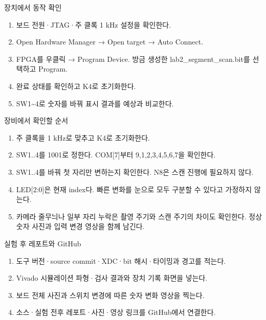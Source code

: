 \begin{frame}{장치에서 동작 확인}
\small
\begin{enumerate}
\item 보드 전원·JTAG·주 클록 1 kHz 설정을 확인한다.
\item Open Hardware Manager → Open target → Auto Connect.
\item FPGA를 우클릭 → Program Device. 방금 생성한 lab2\_segment\_scan.bit를 선택하고 Program.
\item 완료 상태를 확인하고 K4로 초기화한다.
\item SW1\textasciitilde{}4로 숫자를 바꿔 표시 결과를 예상과 비교한다.
\end{enumerate}
\end{frame}

\begin{frame}{장비에서 확인할 순서}
\small
\begin{enumerate}
\item 주 클록을 1 kHz로 맞추고 K4로 초기화한다.
\item SW1..4를 1001로 정한다. COM[7]부터 9,1,2,3,4,5,6,7을 확인한다.
\item SW1..4를 바꿔 첫 자리만 변하는지 확인한다. N8은 스캔 진행에 필요하지 않다.
\item LED[2:0]은 현재 index다. 빠른 변화를 눈으로 모두 구분할 수 있다고 가정하지 않는다.
\item 카메라 줄무늬나 일부 자리 누락은 촬영 주기와 스캔 주기의 차이도 확인한다. 정상 숫자 사진과 입력 변경 영상을 함께 남긴다.
\end{enumerate}
\end{frame}

\begin{frame}{실험 후 레포트와 GitHub}
\small
\begin{enumerate}
\item 도구 버전·source commit·XDC·bit 해시·타이밍과 경고를 적는다.
\item Vivado 시뮬레이션 파형·검사 결과와 장치 기록 화면을 넣는다.
\item 보드 전체 사진과 스위치 변경에 따른 숫자 변화 영상을 찍는다.
\item 소스·실험 전후 레포트·사진·영상 링크를 GitHub에서 연결한다.
\end{enumerate}
\end{frame}

